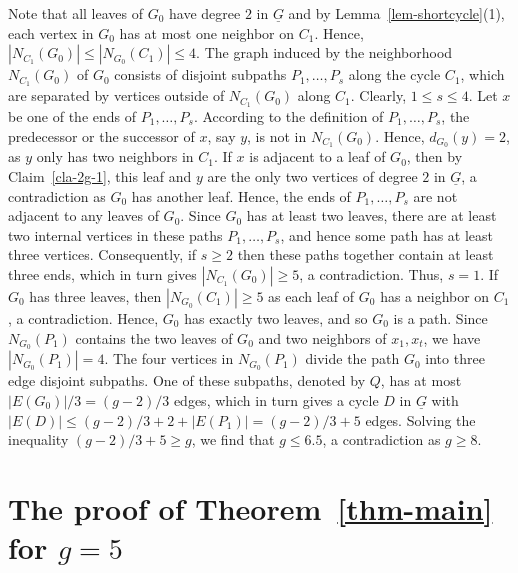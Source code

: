 \documentclass[12pt,oneside]{amsart}
\begin{document}
Note that all leaves of $G_0$ have degree $2$ in $\underline{G}$ and
by Lemma~\ref{lem-shortcycle}(1), each vertex in $G_0$ has at most one neighbor on $C_1$. Hence,
\( |N_{C_1}(G_0)| \le |N_{G_0}(C_1)| \le 4\). The graph induced by the neighborhood $N_{C_1}(G_0)$ of $G_0$ consists of disjoint subpaths $P_1, \dots, P_s$ along the cycle $C_1$, which are separated by vertices outside of $N_{C_1}(G_0)$ along $C_1$.
Clearly, $1 \le s\le 4$.
Let $x$ be one of the ends of $P_1, \dots, P_s$. According to the definition of $P_1, \dots, P_s$, the predecessor or the successor of $x$, say $y$, is not in $N_{C_1}(G_0)$.
Hence, $d_{G_0}(y)=2$, as  $y$ only has two neighbors in $C_1$. If $x$ is adjacent to a leaf of $G_0$, then by Claim~\ref{cla-2g-1}, this leaf and $y$ are the only two vertices of degree $2$ in $\underline{G}$, a contradiction as $G_0$ has another leaf. Hence, the ends of $P_1, \dots, P_s$ are not adjacent to any leaves of $G_0$. Since $G_0$ has at least two leaves, there are at least two internal vertices in these paths $P_1, \dots,P_s$, and hence some path has at least three vertices. Consequently, if $s\ge 2$ then these paths together contain at least three ends, which in turn gives $|N_{C_1}(G_0)| \ge 5$, a contradiction. Thus, $s=1$.
If $G_0$ has three leaves, then $|N_{G_0}(C_1)|\geq 5$ as each leaf of $G_0$ has a neighbor on $C_1$, a contradiction. Hence, $G_0$ has exactly two leaves, and so $G_0$ is a path.
Since  $N_{G_0}(P_1)$ contains the two leaves of $G_0$ and two neighbors of $x_1, x_t$, we have $|N_{G_0}(P_1)| =4$. The four vertices in $N_{G_0}(P_1)$ divide the path $G_0$ into three edge disjoint subpaths. One of these subpaths, denoted by $Q$, has at most $|E(G_0)|/3 =(g-2)/3$ edges, which in turn gives a cycle $D$ in $\underline{G}$ with $|E(D)| \le (g-2)/3 +2 +|E(P_1)| =(g-2)/3 +5$ edges. Solving the inequality $(g-2)/3 +5 \ge g$, we find that $g\le 6.5$, a contradiction as $g\ge 8$.


\section{The proof of Theorem~\ref{thm-main} for \texorpdfstring{$g=5$}{g=5}}\label{oddipf}
\end{document}
